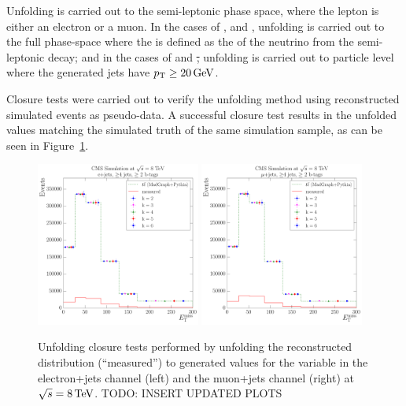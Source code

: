 Unfolding is carried out to the semi-leptonic phase space, where the lepton is either an electron or a muon.
In the cases of \met, \wpt and \mt, unfolding is carried out to the full phase-space where the \met is defined
as the \pt of the neutrino from the semi-leptonic decay; and in the cases of \HT and \st, unfolding is carried
out to particle level where the generated jets have $p_{\mathrm{T}}\geq20\,\text{Ge\hspace{-.08em}V}$.

Closure tests were carried out to verify the unfolding method using reconstructed simulated events as
pseudo-data. A successful closure test results in the unfolded values matching the simulated truth of the same
simulation sample, as can be seen in Figure~\ref{fig:unfolding_closure_tests}.

\begin{figure}[hbtp]
    \centering
     \includegraphics[width=0.48\textwidth]{Chapters/04_Analysis/04b_XSections/images/unfolding_tests/8TeV/closure/electron_MET_RooUnfoldSvd_closure.pdf}\hfill
     \includegraphics[width=0.48\textwidth]{Chapters/04_Analysis/04b_XSections/images/unfolding_tests/8TeV/closure/muon_MET_RooUnfoldSvd_closure.pdf}\\
	 \caption{Unfolding closure tests performed by unfolding the reconstructed \MADGRAPH distribution
	 (``measured'') to generated values for the \met variable in the electron+jets channel (left) and the
	 muon+jets channel (right) at $\sqrt{s}=8\,\text{Te\hspace{-.08em}V}$. TODO: INSERT UPDATED PLOTS} %
     \label{fig:unfolding_closure_tests}
\end{figure}

